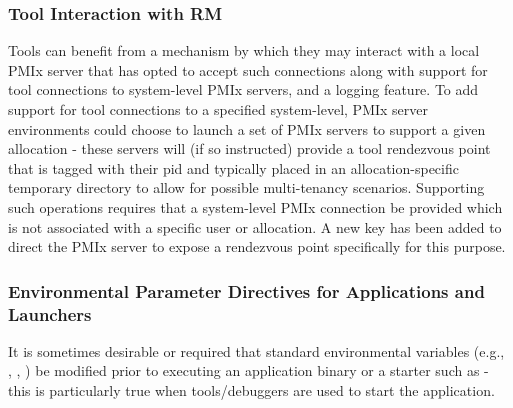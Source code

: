 \subsubsection{Tool Interaction with RM}

Tools can benefit from a mechanism by which they may interact with a local PMIx server that has opted to accept such connections along with support for tool connections to system-level PMIx servers, and a logging feature. To add support for tool connections to a specified system-level, PMIx server environments could choose to launch a set of PMIx servers to support a given allocation - these servers will (if so instructed) provide a tool rendezvous point that is tagged with their pid and typically placed in an allocation-specific temporary directory to allow for possible multi-tenancy scenarios. Supporting such operations requires that a system-level PMIx connection be provided which is not associated with a specific user or allocation. A new key has been added to direct the PMIx server to expose a rendezvous point specifically for this purpose.

{\large {}}

{\large {}}

{\large {}}

{\large {}}

{\large {}}

\subsubsection{Environmental Parameter Directives for Applications and Launchers}

It is sometimes desirable or required that standard environmental variables (e.g., , , ) be modified prior to executing an application binary or a starter such as  - this is particularly true when tools/debuggers are used to start the application.


{\large {}}


